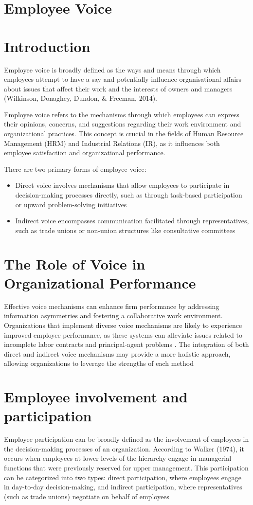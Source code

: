 \documentclass[10pt]{article}
\begin{document}
\section*{Employee Voice}
\section*{Introduction}
Employee voice is broadly defined as the ways and means through which employees attempt to have a say and potentially influence organisational affairs about issues that affect their work and the interests of owners and managers (Wilkinson, Donaghey, Dundon, \& Freeman, 2014).

Employee voice refers to the mechanisms through which employees can express their opinions, concerns, and suggestions regarding their work environment and organizational practices. This concept is crucial in the fields of Human Resource Management (HRM) and Industrial Relations (IR), as it influences both employee satisfaction and organizational performance.

There are two primary forms of employee voice:

\begin{itemize}
  \item Direct voice involves mechanisms that allow employees to participate in decision-making processes directly, such as through task-based participation or upward problem-solving initiatives
  \item Indirect voice encompasses communication facilitated through representatives, such as trade unions or non-union structures like consultative committees
\end{itemize}

\section*{The Role of Voice in Organizational Performance}
Effective voice mechanisms can enhance firm performance by addressing information asymmetries and fostering a collaborative work environment. Organizations that implement diverse voice mechanisms are likely to experience improved employee performance, as these systems can alleviate issues related to incomplete labor contracts and principal-agent problems . The integration of both direct and indirect voice mechanisms may provide a more holistic approach, allowing organizations to leverage the strengths of each method

\section*{Employee involvement and participation}
Employee participation can be broadly defined as the involvement of employees in the decision-making processes of an organization. According to Walker (1974), it occurs when employees at lower levels of the hierarchy engage in managerial functions that were previously reserved for upper management. This participation can be categorized into two types: direct participation, where employees engage in day-to-day decision-making, and indirect participation, where representatives (such as trade unions) negotiate on behalf of employees
\end{document}
